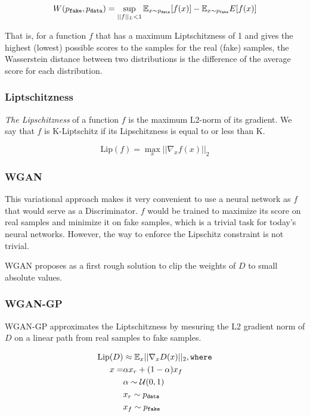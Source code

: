 \begin{equation}
    W(p_\texttt{fake}, p_\texttt{data}) = \sup_{||f||_L < 1} \mathbb{E}_{x \sim p_\texttt{data}}[f(x)] - \mathbb{E}_{x \sim p_\texttt{fake}}E[f(x)]
\end{equation}

That is, for a function $f$ that has a maximum Liptschitzness of 1 and gives the highest (lowest) possible scores to the samples for the real (fake) samples, the Wasserstein distance between two distributions is the difference of the average score for each distribution.

\subsubsection{Liptschitzness}
\emph{The Lipschitzness} of a function $f$ is the maximum L2-norm of its gradient. We say that $f$ is K-Liptschitz if its Lipschitzness is equal to or less than K.

\begin{equation}
    \text{Lip}(f) = \max_x ||\nabla_x f(x)||_2
\end{equation}

\subsubsection{\ac{WGAN}}

This variational approach makes it very convenient to use a neural network as $f$ that would serve as a Discriminator. $f$ would be trained to maximize its score on real samples and minimize it on fake samples, which is a trivial task for today's neural networks. However, the way to enforce the Lipschitz constraint is not trivial.

\ac{WGAN} \citep{wgan} proposes as a first rough solution to clip the weights of $D$ to small absolute values.

\subsubsection{\ac{WGAN-GP}}

\ac{WGAN-GP} \citep{wgangp} approximates the Liptschitzness by mesuring the L2 gradient norm of $D$ on a linear path from real samples to fake samples.

\begin{equation}
\begin{split}
    \text{Lip}(D) &\approx \mathbb{E}_x  ||\nabla_x D(x)||_2, \texttt{where} \\
    x = & \alpha x_r + (1-\alpha) x_f \\
    & \alpha \sim \mathcal{U}(0, 1) \\
    & x_r \sim p_\texttt{data} \\
    & x_f  \sim p_\texttt{fake}
\end{split}
\end{equation}

